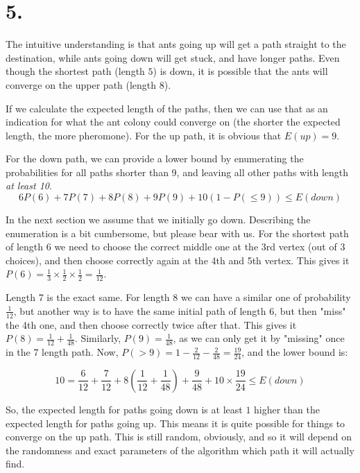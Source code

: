 \documentclass{scrartcl}
\begin{document}
\section*{5.}
The intuitive understanding is that ants going up will get a path straight
to the destination, while ants going down will get stuck, and have longer
paths. Even though the shortest path (length $5$) is down, it is possible
that the ants will converge on the upper path (length $8$).

If we calculate the expected length of the paths, then we can use that as
an indication for what the ant colony could converge on (the shorter the
expected length, the more pheromone). For the up path,
it is obvious that $E(up) = 9$.

For the down path, we can provide a lower bound by enumerating the
probabilities for all paths shorter than 9, and leaving all other paths
with length \emph{at least 10}.
\begin{equation}
  6  P(6) + 7  P(7) + 8  P(8) + 9  P(9) + 10(1 - P(\le9)) \le E(down)
\end{equation}

In the next section we assume that we initially go down. Describing the
enumeration is a bit cumbersome, but please bear with us. For the shortest
path of length 6 we need to choose the correct middle one at the 3rd
vertex (out of 3 choices), and then choose correctly again at the 4th and
5th vertex. This gives it $P(6) = \frac{1}{3} \times \frac{1}{2} \times
\frac{1}{2} = \frac{1}{12}$.

Length 7 is the exact same. For length 8 we can have a similar one of
probability $\frac{1}{12}$, but another way is to have the same initial
path of length 6, but then "miss" the 4th one, and then choose
correctly twice after that. This gives it $P(8) = \frac{1}{12} +
\frac{1}{48}$. Similarly, $P(9) = \frac{1}{48}$, as we can only get it by
"missing" once in the 7 length path. Now, $P(>9) = 1 - \frac{2}{12} -
\frac{2}{48} = \frac{19}{24}$, and the lower bound is:

\begin{equation}
  10 = \frac{6}{12} + \frac{7}{12} + 8(\frac{1}{12} + \frac{1}{48}) +
  \frac{9}{48} + 10 \times \frac{19}{24} \le E(down)
\end{equation}

So, the expected length for paths going down is at least $1$ higher
than the expected length for paths going up. This means it is quite
possible for things to converge on the up path. This is still random,
obviously, and so it will depend on the randomness and exact parameters of
the algorithm which path it will actually find.
\end{document}
